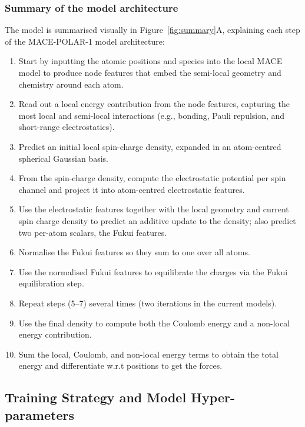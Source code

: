 \documentclass[aps,%
superscriptaddress,
 amsmath,amssymb,
floatfix,
twocolumn
]{revtex4-2}
\newcommand{\MFP}{MACE-POLAR-1 }
\begin{document}
\subsubsection{Summary of the model architecture}

The model is summarised visually in Figure~\ref{fig:summary}A, explaining each step of the \MFP model architecture:

\begin{enumerate}
      \item Start by inputting the atomic positions and species into the local MACE model to produce node features that embed the semi-local geometry and chemistry around each atom.
      \item Read out a local energy contribution from the node features, capturing the most local and semi-local interactions (e.g., bonding, Pauli repulsion, and short-range electrostatics).
      \item Predict an initial local spin-charge density, expanded in an atom-centred spherical Gaussian basis.
      \item From the spin-charge density, compute the electrostatic potential per spin channel and project it into atom-centred electrostatic features.
      \item Use the electrostatic features together with the local geometry and current spin charge density to predict an additive update to the density; also predict two per-atom scalars, the Fukui features.
      \item Normalise the Fukui features so they sum to one over all atoms.
      \item Use the normalised Fukui features to equilibrate the charges via the Fukui equilibration step.
      \item Repeat steps (5–7) several times (two iterations in the current models).
      \item Use the final density to compute both the Coulomb energy and a non-local energy contribution.
      \item Sum the local, Coulomb, and non-local energy terms to obtain the total energy and differentiate w.r.t positions to get the forces.
  \end{enumerate}



\subsection{Training Strategy and Model Hyper-parameters}
%
\end{document}
